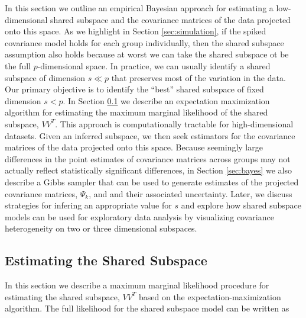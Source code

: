 \documentclass[12pt]{article}
\begin{document}
In this section we outline an empirical Bayesian approach for
estimating a low-dimensional shared subspace and the covariance
matrices of the data projected onto this space. As we highlight in
Section \ref{sec:simulation}, if the spiked covariance model holds for
each group individually, then the shared subspace assumption also
holds because at worst we can take the shared subspace ot be the full
$p$-dimensional space. In practice, we can usually identify a shared
subspace of dimension $s \ll p$ that preserves most of the variation
in the data.  Our primary objective is to identify the ``best'' shared
subspace of fixed dimension $s < p$.  In Section \ref{sec:em} we
describe an expectation maximization algorithm for estimating the
maximum marginal likelihood of the shared subspace, $VV^T$.  This
approach is computationally tractable for high-dimensional datasets.
Given an inferred subspace, we then seek estimators for the covariance
matrices of the data projected onto this space.  Because seemingly
large differences in the point estimates of covariance matrices across
groups may not actually reflect statistically significant differences,
in Section \ref{sec:bayes} we also describe a Gibbs sampler that can
be used to generate estimates of the projected covariance matrices,
$\Psi_k$, and and their associated uncertainty.  Later, we discuss
strategies for infering an appropriate value for $s$ and explore how
shared subspace models can be used for exploratory data analysis by
visualizing covariance heterogeneity on two or three dimensional
subspaces.





\subsection{Estimating the  Shared Subspace}
\label{sec:em}

In this section we describe a maximum marginal likelihood procedure for
estimating the shared subspace, $VV^T$ based on the
expectation-maximization algorithm.  The full likelihood
for the shared subspace model can be written as
\end{document}
